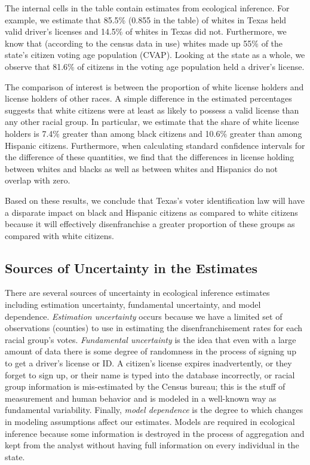 \documentclass[12pt]{article}
\begin{document}
The internal cells in the table contain estimates from ecological
inference. For example, we estimate that 85.5\% (0.855 in the table) of
whites in Texas held valid driver's licenses and 14.5\%
of whites in Texas did not.
Furthermore, we know that (according to the census data in use) whites made up 55\% of the state's
citizen voting age population (CVAP).  Looking at the state as a whole, we
observe that 81.6\% of citizens in the voting age population held a driver's license. 

The comparison of interest is between the proportion of white license holders and license holders of other races. A simple difference in the estimated percentages suggests that white citizens were at least as likely to possess a valid license than any other racial group. In particular, we estimate that the share of white license holders is 7.4\% greater than among black citizens and 10.6\% greater than among Hispanic citizens. Furthermore, when calculating standard confidence intervals for the difference of these quantities, we find that the differences in license holding between whites and blacks as well as between whites and Hispanics do not overlap with zero.

Based on these results, we conclude that Texas's voter identification law will have a disparate impact on black and Hispanic citizens as compared to white citizens because it will effectively disenfranchise a greater proportion of these groups as compared with white citizens.

\subsection{Sources of Uncertainty in the Estimates}

There are several sources of uncertainty in ecological inference
estimates including estimation uncertainty, fundamental uncertainty,
and model dependence.  \emph{Estimation uncertainty} occurs because we
have a limited set of observations (counties) to use in
estimating the disenfranchisement rates for each racial group's votes.
\emph{Fundamental uncertainty} is the idea that even with a large
amount of data there is some degree of randomness in the process of
signing up to get a driver's license or ID.  A citizen's license
expires inadvertently, or they forget to sign up, or their name is
typed into the database incorrectly, or racial group information is
mis-estimated by the Census bureau; this is the stuff of measurement
and human behavior and is modeled in a well-known way as fundamental
variability. Finally, \emph{model dependence} is the degree to which
changes in modeling assumptions affect our estimates.  Models are
required in ecological inference because some information is destroyed
in the process of aggregation and kept from the analyst without having
full information on every individual in the state.
\end{document}
